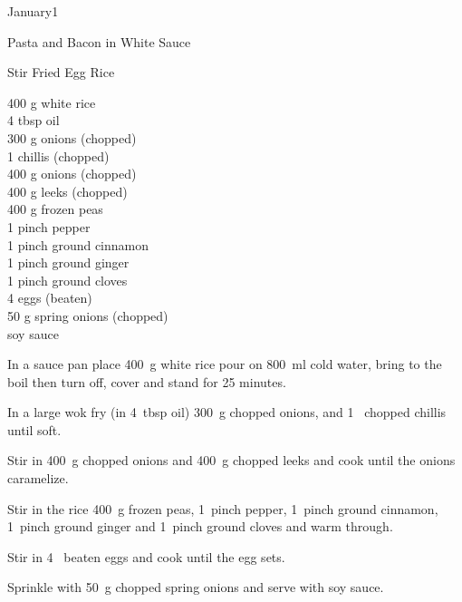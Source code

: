 \begin{menu}{January1}
\begin{recipe}{2}{Pasta and Bacon in White Sauce}
\begin{instructions}
    \end{instructions}
    \end{recipe}%
  
    \begin{recipe}{2}{Stir Fried Egg Rice}%
		\begin{ingredients}
		400 g white rice  \\
	4 tbsp oil  \\
	300 g onions (chopped) \\
	1  chillis (chopped) \\
	400 g onions (chopped) \\
	400 g leeks (chopped) \\
	400 g frozen peas  \\
	1 pinch pepper  \\
	1 pinch ground cinnamon  \\
	1 pinch ground ginger  \\
	1 pinch ground cloves  \\
	4  eggs (beaten) \\
	50 g spring onions (chopped) \\
	  soy sauce  \\
	
		\end{ingredients}
	
	
    \begin{instructions}
    \item 
    In a
    sauce pan
    place
    400~g  white rice
    pour on
    800~ml  cold water,
    bring to the boil then turn off, cover and stand for 25 minutes.
  \item 
        In a large wok fry
        (in 4~tbsp  oil)
        300~g chopped onions,
        and
        1~ chopped chillis
        until soft.
      \item 
        Stir in
        400~g chopped onions
        and
        400~g chopped leeks
        and cook until the onions caramelize.
      \item 
        Stir in the rice
        400~g  frozen peas,
        1~pinch  pepper,
        1~pinch  ground cinnamon,
        1~pinch  ground ginger
        and
        1~pinch  ground cloves
        and warm through.
      \item 
        Stir in
        4~ beaten eggs
        and cook until the egg sets.
      \item 
        Sprinkle with
        50~g chopped spring onions
        and serve with
          soy sauce.
      

\end{instructions}
\end{recipe}
\end{menu}
